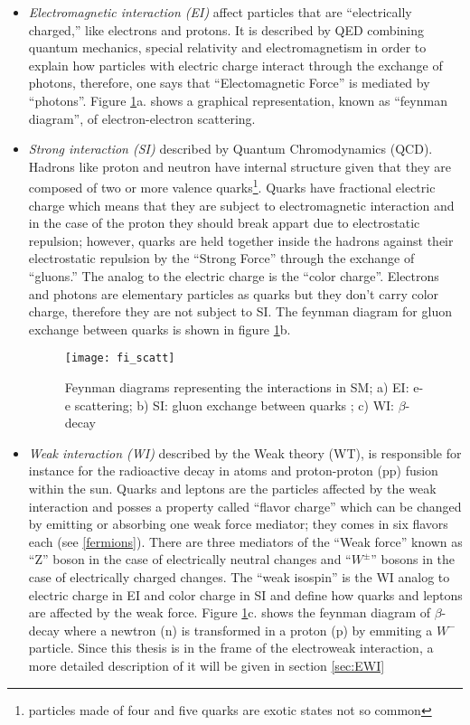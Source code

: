 \begin{itemize}

\item \textit{Electromagnetic interaction (EI)} affect particles that are ``electrically charged,'' like electrons and protons. It is described by QED combining quantum mechanics, special relativity and electromagnetism in order to explain how particles with electric charge interact through the exchange of photons, therefore, one says that ``Electomagnetic Force'' is mediated by ``photons''. Figure \ref{fi_scatt}a.  shows a graphical representation, known as ``feynman diagram'', of electron-electron scattering.    

\item \textit{Strong interaction (SI)} described by Quantum Chromodynamics (QCD). Hadrons like proton and neutron have internal structure given that they are composed of two or more valence quarks\footnote{particles made of four and five quarks are exotic states not so common}. Quarks have fractional electric charge which means that they are subject to electromagnetic interaction and in the case of the proton they should break appart due to electrostatic repulsion; however, quarks are held together inside the hadrons against their electrostatic repulsion by the ``Strong Force'' through the exchange of ``gluons.'' The analog to the electric charge is the ``color charge''. Electrons and photons are elementary particles as quarks but they don't carry color charge, therefore they are not subject to SI. The feynman diagram for gluon exchange between quarks is shown in figure \ref{fi_scatt}b.  

\begin{figure}[h!]
\centering
    \texttt{[image: fi\_scatt]}
\caption[SM interactions diagrams]{Feynman diagrams representing the interactions in SM; a) EI: e-e scattering; b) SI: gluon exchange between quarks ; c) WI: $\beta$-decay }
\label{fi_scatt}
\end{figure}

\item \textit{Weak interaction (WI)} described by the Weak theory (WT), is responsible for instance for the radioactive decay in atoms and proton-proton (pp) fusion within the sun. Quarks and leptons are the particles affected by the weak interaction and posses a property called ``flavor charge'' which can be changed by emitting or absorbing one weak force mediator; they comes in six flavors each (see \ref{fermions}). There are three mediators of the ``Weak force'' known as ``Z'' boson in the case of electrically neutral changes and ``$W^\pm$'' bosons in the case of electrically charged changes. The ``weak isospin'' is the WI analog to electric charge in EI and color charge in SI and define how quarks and leptons are affected by the weak force. Figure \ref{fi_scatt}c. shows the feynman diagram of $\beta$-decay where a newtron (n) is transformed in a proton (p) by emmiting a $W^-$ particle. Since this thesis is in the frame of the electroweak interaction, a more detailed description of it will be given in section \ref{sec:EWI}


\end{itemize}
